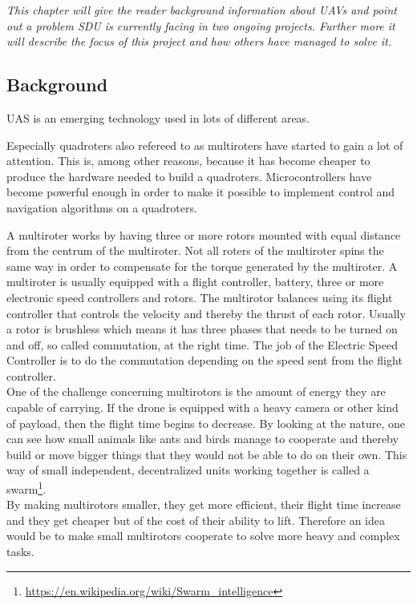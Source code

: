 \textit{This chapter will give the reader background information about UAVs and point out a problem SDU is currently facing in two ongoing projects. Further more it will describe the focus of this project and how others have managed to solve it.}
\subsection*{Background}
UAS is an emerging technology used in lots of different areas\cite{gupta2013review}.

Especially quadroters also refereed to as multiroters have started to gain a lot of attention. This is, among other reasons, because it has become cheaper to produce the hardware needed to build a quadroters. Microcontrollers have become powerful enough in order to make it possible to implement control and navigation algorithms on a quadroters.\cite{gibiansky2010quadcopter}

A multiroter works by having three or more rotors mounted with equal distance from the centrum of the multiroter.
Not all roters of the multiroter spins the same way in order to compensate for the torque generated by the multiroter.
A multiroter is usually equipped with a flight controller, battery, three or more electronic speed controllers and rotors.
The multirotor balances using its flight controller that controls the velocity and thereby the thrust of each rotor. Usually a rotor is brushless which means it has three phases that needs to be turned on and off, so called commutation, at the right time. The job of the Electric Speed Controller is to do the commutation depending on the speed sent from the flight controller. \\

One of the challenge concerning multirotors is the amount of energy they are capable of carrying. If the drone is equipped with a heavy camera or other kind of payload, then the flight time begins to decrease. 
By looking at the nature, one can see how small animals like ants and birds manage to cooperate and thereby build or move bigger things that they would not be able to do on their own. This way of small independent, decentralized units working together is called a swarm\footnote{\url{https://en.wikipedia.org/wiki/Swarm\_intelligence}}.\\
By making multirotors smaller, they get more efficient, their flight time increase and they get cheaper but of the cost of their ability to lift\cite{1_kumar_2016}. Therefore an idea would be to make small multirotors cooperate to solve more heavy and complex tasks. \\

